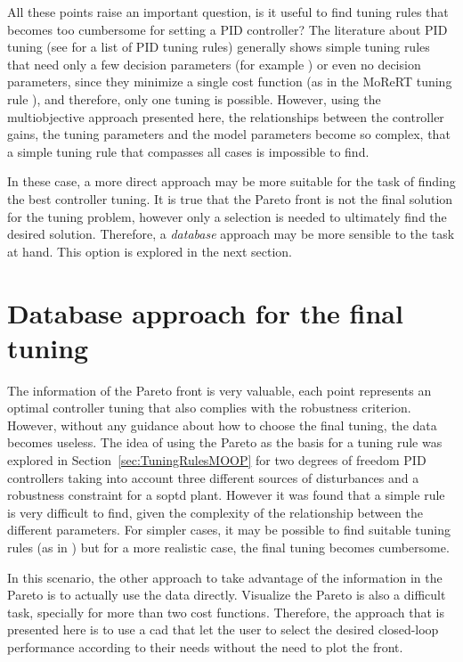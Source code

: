 All these points raise an important question, is it useful to find tuning rules that becomes too cumbersome for setting a PID controller? The literature about PID tuning (see \cite{ODwyer2000} for a list of PID tuning rules) generally shows simple tuning rules that need only a few decision parameters (for example \cite{Skogestad2003}) or even no decision parameters, since they minimize a single cost function (as in the MoReRT tuning rule \cite{Alfaro2016}), and therefore, only one tuning is possible. However, using the multiobjective approach presented here, the relationships between the controller gains, the tuning parameters and the model parameters become so complex, that a simple tuning rule that compasses all cases is impossible to find.

In these case, a more direct approach may be more suitable for the task of finding the best controller tuning. It is true that the Pareto front is not the final solution for the tuning problem, however only a selection is needed to ultimately find the desired solution. Therefore, a \textit{database} approach may be more sensible to the task at hand. This option is explored in the next section.
%
\section{Database approach for the final tuning}
\label{sec:DatabaseMOOP}
%
The information of the Pareto front is very valuable, each point represents an optimal controller tuning that also complies with the robustness criterion. However, without any guidance about how to choose the final tuning, the data becomes useless. The idea of using the Pareto as the basis for a tuning rule was explored in Section~\ref{sec:TuningRulesMOOP} for two degrees of freedom PID controllers taking into account three different sources of disturbances and a robustness constraint for a \gls{soptd} plant. However it was found that a simple rule is very difficult to find, given the complexity of the relationship between the different parameters. For simpler cases, it may be possible to find suitable tuning rules (as in \cite{ContrerasLeiva2015a}) but for a more realistic case, the final tuning becomes cumbersome.

In this scenario, the other approach to take advantage of the information in the Pareto is to actually use the data directly. Visualize the Pareto is also a difficult task, specially for more than two cost functions. Therefore, the approach that is presented here is to use a \gls{cad} that let the user to select the desired closed-loop performance according to their needs without the need to plot the front.

